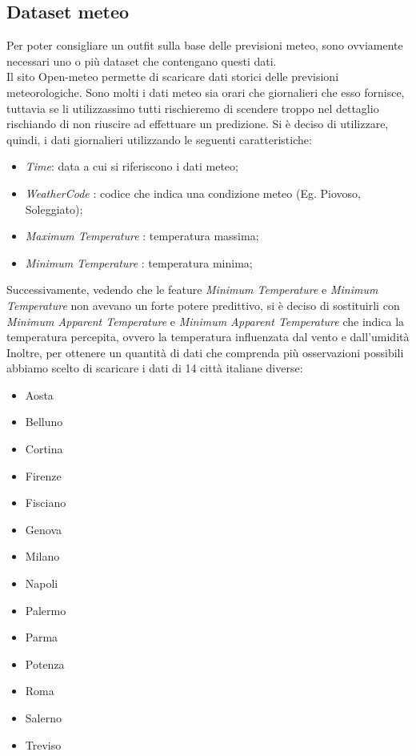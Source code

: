 \documentclass[a4paper, 11pt, oneside]{report}
\begin{document}
                \subsection{Dataset meteo}
                Per poter consigliare un outfit sulla base delle previsioni meteo, sono ovviamente necessari
                uno o più dataset che contengano questi dati.\\
                Il sito Open-meteo\cite{9} permette di scaricare dati storici delle previsioni meteorologiche.
                Sono molti i dati meteo sia orari che giornalieri che esso fornisce, tuttavia se li utilizzassimo tutti rischieremo di scendere troppo nel dettaglio
                rischiando di non riuscire ad effettuare un predizione.
                Si è deciso di utilizzare, quindi, i dati giornalieri utilizzando le seguenti caratteristiche:
                \begin{itemize}
                    \item \emph{Time}: data a cui si riferiscono i dati meteo;
                    \item \emph{WeatherCode} : codice che indica una condizione meteo (Eg. Piovoso, Soleggiato);
                    \item \emph{Maximum Temperature}  : temperatura massima;
                    \item \emph{Minimum Temperature} : temperatura minima;
                \end{itemize}
                Successivamente, vedendo che le feature \emph{Minimum Temperature} e \emph{Minimum Temperature} non avevano un
                forte potere predittivo, si è deciso di sostituirli con \emph{Minimum Apparent Temperature}
                e \emph{Minimum Apparent Temperature} che indica la temperatura percepita, ovvero la temperatura influenzata dal vento e dall'umidità
                Inoltre, per ottenere un quantità di dati che comprenda più osservazioni possibili abbiamo scelto di scaricare i dati di
                14 città italiane diverse:
                \begin{itemize}
                    \item Aosta
                    \item Belluno
                    \item Cortina
                    \item Firenze
                    \item Fisciano
                    \item Genova
                    \item Milano
                    \item Napoli
                    \item Palermo
                    \item Parma
                    \item Potenza
                    \item Roma
                    \item Salerno
                    \item Treviso
                \end{itemize}
\end{document}
